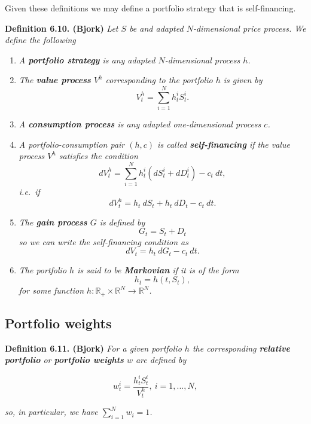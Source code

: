 \documentclass[
]{book}
\providecommand{\tightlist}{%
  \setlength{\itemsep}{0pt}\setlength{\parskip}{0pt}}
\begin{document}
Given these definitions we may define a portfolio strategy that is self-financing.

\textbf{Definition 6.10. (Bjork)} \emph{Let \(S\) be and adapted \(N\)-dimensional price process. We define the following}

\begin{enumerate}
\def\labelenumi{\arabic{enumi}.}
\tightlist
\item
  \emph{A \textbf{portfolio strategy} is any adapted \(N\)-dimensional process \(h\).}
\item
  \emph{The \textbf{value process} \(V^h\) corresponding to the portfolio \(h\) is given by}
  \[
    V_t^h=\sum_{i=1}^N h_t^iS_t^i.\tag{6.17}
    \]
\item
  \emph{A \textbf{consumption process} is any adapted one-dimensional process \(c\).}
\item
  \emph{A portfolio-consumption pair \((h,c)\) is called \textbf{self-financing} if the value process \(V^h\) satisfies the condition}
  \[
    dV_t^h=\sum_{i=1}^N h_t^i(dS_t^i+d D^i_t)-c_t\ dt,\tag{6.18}
    \]
  \emph{i.e.~if}
  \[
    dV_t^h=h_t\ dS_t + h_t\ dD_t -c_t\ dt.
    \]
\item
  \emph{The \textbf{gain process} \(G\) is defined by}
  \[
    G_t=S_t+D_t\tag{6.19}
    \]
  \emph{so we can write the self-financing condition as}
  \[
    dV_t=h_t\ dG_t-c_t\ dt.\tag{6.20}
    \]
\item
  \emph{The portfolio \(h\) is said to be \textbf{Markovian} if it is of the form}
  \[
    h_t=h(t,S_t),
    \]
  \emph{for some function \(h : \mathbb{R}_+\times \mathbb{R}^N\to\mathbb{R}^N\).}
\end{enumerate}

\hypertarget{portfolio-weights}{%
\subsection{Portfolio weights}\label{portfolio-weights}}

\textbf{Definition 6.11. (Bjork)} \emph{For a given portfolio \(h\) the corresponding \textbf{relative portfolio} or \textbf{portfolio weights} \(w\) are defined by}

\[
w_t^i=\frac{h_t^iS_t^i}{V_t^h},\ i=1,...,N,\tag{6.21}
\]

\emph{so, in particular, we have \(\sum_{i=1}^N w_i=1\).}
\end{document}
